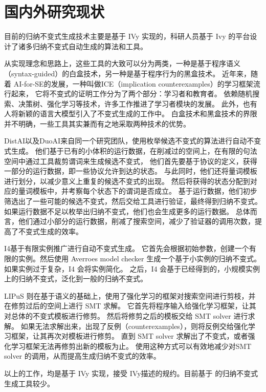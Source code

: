 \section{国内外研究现状}
目前的归纳不变式生成技术主要是基于 IVy 实现的，科研人员基于 Ivy 的平台设计了诸多归纳不变式自动生成的算法和工具。

从实现理念和思路上，这些工具的大致可以分为两类，一种是基于程序语义（syntax-guided）\cite{syntax}的白盒技术，另一种是基于程序行为的黑盒技术。
近年来，随着 AI-for-SE的发展，一种叫做ICE\cite{ICE}（implication counterexamples）\cite{safe}的学习框架流行起来，
它将不变式的证明工作分为了两个部分：学习者和教育者。
依赖随机搜索、决策树\cite{garg2016learning}、强化学习\cite{LIPuS}等技术，许多工作推进了学习者模块的发展。
此外，也有人将新颖的语言大模型引入了不变式生成的工作中\cite{llm}。
白盒技术和黑盒技术的界限并不明确，一些工具其实兼而有之地采取两种技术的优势。

DistAI\cite{DistAI}以及DuoAI\cite{DuoAI}来自同一个研究团队，使用枚举候选不变式的算法进行自动不变式生成。
他们基于已有的小体积的运行数据，在削减过的空间上，在有限的句法空间中通过工具裁剪谓词来生成候选不变式，
他们首先要基于协议的定义，获得一部分的运行数据，即一些协议允许到达的状态。
与此同时，他们还将量词模板进行划分，以减少意义上重复的候选不变式的出现。
然后将获得的状态分配到对应的量词模板中，并考察每个状态下的谓词是否成立。
基于运行数据，他们初步筛选出了一些可能的候选不变式，然后交给工具进行验证，最终得到归纳不变式。
如果运行数据不足以枚举出归纳不变式，他们也会生成更多的运行数据。
总体而言，他们通过小部分的运行数据，削减了搜索空间，减少了验证器的调用次数，提高了不变式生成的效率。

I4\cite{I4}基于有限实例推广进行自动不变式生成。
它首先会根据初始参数，创建一个有限的实例。然后使用 Averroes model checker \cite{goel2019model}生成一个基于小实例的归纳不变式。
如果实例过于复杂，I4 会将实例简化。
之后，I4 会基于已经得到的，小规模实例上的归纳不变式，泛化到一般的归纳不变式。

LIPuS 则在基于语义的基础上，使用了强化学习的框架对搜索空间进行剪枝，并在修剪过后的空间上进行 SMT 求解。
它首先将程序输入给强化学习框架，让其对总体的不变式模板进行修剪。
然后将修剪之后的模板交给 SMT solver 进行求解。
如果无法求解出来，出现了反例（counterexamples），则将反例交给强化学习框架，让其再次对模板进行修剪。
直到 SMT solver 求解出了不变式，或者强化学习框架无法再修剪出新的模板为止。
使用这种方式可以有效地减少对SMT solver 的调用，从而提高生成归纳不变式的效率。

以上的工作，均是基于 IVy 实现，接受 IVy描述的规约。目前基于 \TLA 的归纳不变式生成工具较少。

